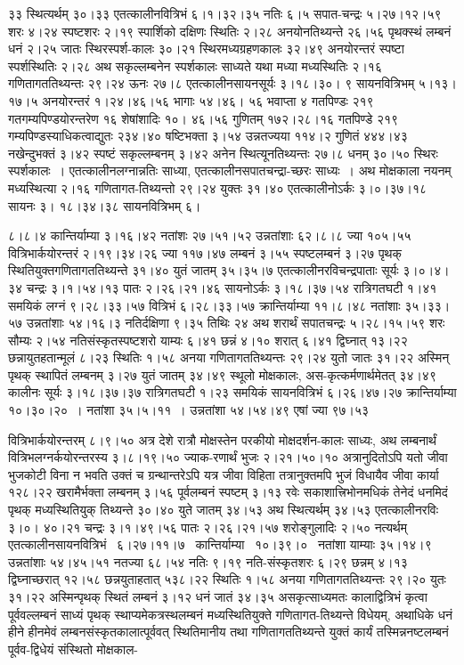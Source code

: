 \documentclass[11pt, openany]{book}
\begin{document}
\newpage

\noindent ३३ स्थित्यर्थम् ३०।३३ एतत्कालीनवित्रिभं ६।१।३२।३५ नतिः ६।५ सपात-चन्द्रः ५।२७।१२।५९ शरः ४।२४ स्पष्टशरः २।१९ स्पार्शिको दक्षिणः स्थितिः २।२८ अनयोनतिथ्यन्ते २६।५६ पृथक्स्थं लम्बनं धनं २।२५ जातः स्थिरस्पर्श-कालः ३०।२१ स्थिरमध्यग्रहणकालः ३२।४९ अनयोरन्तरं स्पष्टा स्पर्शस्थितिः २।२८ अथ सकृल्लम्बनेन स्पर्शकालः साध्यते यथा मध्या मध्यस्थितिः २।१६ गणितागततिथ्यन्तः २९।२४ ऊनः २७।८ एतत्कालीनसायनसूर्यः ३।१८।३०। ९ सायनवित्रिभम् ५।१३।१७।५ अनयोरन्तरं १।२४।४६।५६ भागाः ५४।४६। ५६ भवाप्ता ४ गतपिण्डः २१९ गतगम्यपिण्डयोरन्तरेण १६ शेषांशादिः १०। ४६।५६ \;गुणितम् \;१७२।२८।१६ \;गतपिण्डे \;२१९ \;गम्यपिण्डस्याधिकत्वाद्युतः २३४।४० षष्टिभक्ता ३।५४ उन्नतज्यया ११४।२ गुणितं ४४४।४३ नखेन्दुभक्तं ३।४२ स्पष्टं सकृल्लम्बनम् ३।४२ अनेन स्थित्यूनतिथ्यन्तः २७।८ धनम् ३०।५० स्थिरः स्पर्शकालः~। एतत्कालीनलग्नान्नतिः साध्या, एतत्कालीनसपातचन्द्रा-च्छरः \;साध्यः~। अथ \;मोक्षकाला \;नयनम्\textendash \,मध्यस्थित्या \;२।१६ \;गणितागत-तिथ्यन्तो २९।२४ युक्तः ३१।४० एतत्कालीनोऽर्कः ३।०।३७।१८ सायनः ३। १८।३४।३८ सायनवित्रिभम् ६।

\newpage

\noindent ८।८।४ कान्तिर्याम्या ३।१६।४२ नतांशः २७।५१।५२ उन्नतांशाः ६२।८।८ ज्या १०५।५५ \;वित्रिभार्कयोरन्तरं \;२।१९।३४।२६ \;ज्या \;११७।४७ \;लम्बनं \;३।५५ स्पष्टलम्बनं ३।२७ पृथक् स्थितियुक्तगणितागततिथ्यन्ते ३१।४० युतं जातम् ३५।३५।७ एतत्कालीनरविचन्द्रपाताः सूर्यः ३।०।४।३४ चन्द्रः ३।१।५४।१३ पातः २।२६।२१।४६ सायनोऽर्कः ३।१८।३७।५४ रात्रिगतघटी १।४१ समयिकं लग्नं ९।२८।३३।५७ वित्रिभं ६।२८।३३।५७ क्रान्तिर्याम्या ११।८।४८ नतांशाः ३५।३३।५७ उन्नतांशाः ५४।१६।३ नतिर्दक्षिणा ९।३५ तिथिः २४ अथ शरार्थं सपातचन्द्रः ५।२८।१५।५९ शरः सौम्यः २।५४ नतिसंस्कृतस्पष्टशरो याम्यः ६।४१ \;छन्नं \;४।१० \;शरात् \;६।४१ \;द्विघ्नात् \;१३।२२ \;छन्नायुतहतान्मूलं \;८।२३ स्थितिः १।५८ अनया गणितागततिथ्यन्तः २९।२४ युतो जातः ३१।२२ अस्मिन् पृथक् स्थापितं लम्बनम् ३।२७ युतं जातम् ३४।४९ स्थूलो मोक्षकालः, अस-कृत्कर्मणार्थमेतत् ३४।४९ कालीनः सूर्यः ३।१८।३७।३७ रात्रिगतघटी १।२३ समयिकं सायनवित्रिभं ६।२६।४७।२७ क्रान्तिर्याम्या १०।३०।२०~। नतांशा ३५।५।११~। उन्नतांशा ५४।५४।४९ एषां ज्या ९७।५३

\newpage

\noindent वित्रिभार्कयोरन्तरम् ८।९।५० अत्र देशे रात्रौ मोक्षस्तेन परकीयो मोक्षदर्शन-कालः साध्यः, अथ लम्बनार्थं वित्रिभलग्नर्कयोरन्तरस्य ३।८।१९।५० ज्याक-रणार्थं भुजः २।२१।५०।१० अत्रानुदितोऽपि यतो जीवा भुजकोटी विना न भवति उक्तं च ग्रन्थान्तरेऽपि यत्र जीवा विहिता तत्रानुक्तमपि भुजं विधायैव जीवा कार्या १२८।२२ खरामैर्भक्ता लम्बनम् ३।५६ पूर्वलम्बनं स्पष्टम् ३।१३ रवेः सकाशात्त्रिभोनमधिकं तेनेदं धनमिदं पृथक् मध्यस्थितियुक् तिथ्यन्ते ३०।४० युते जातम् ३४।५३ अथ स्थित्यर्थम् ३४।५३ एतत्कालीनरविः ३।०। ४०।२१ चन्द्रः ३।१।४९।५६ पातः २।२६।२१।५७ शरोङ्गुलादिः २।५० नत्यर्थम् एतत्कालीनसायनवित्रिभं ~६।२७।११।७ ~कान्तिर्याम्या ~१०।३९।० ~नतांशा याम्याः ३५।१४।९ उन्नतांशाः ५४।४५।५१ नतज्या ६८।५४ नतिः ९।१९ नति-संस्कृतशरः ६।२९ छन्नम् ४।१३ द्विघ्नाच्छरात् १२।५८ छन्नयुताहतात् ५३८।२२ स्थितिः १।५८ अनया गणितागततिथ्यन्तः २९।२० युतः ३१।२२ अस्मिन्पृथक् स्थितं लम्बनं ३।१२ धनं जातं ३४।३५ असकृत्साध्यमतः कालाद्वित्रिभं कृत्वा पूर्ववल्लम्बनं साध्यं पृथक् स्थाप्यमेकत्रस्थलम्बनं मध्यस्थितियुक्ते गणितागत-तिथ्यन्ते विधेयम्, अथाधिके धनं हीने हीनमेवं लम्बनसंस्कृतकालात्पूर्ववत् स्थितिमानीय तथा गणितागततिथ्यन्ते युक्तं कार्यं तस्मिन्ननष्टलम्बनं पूर्वव-द्विधेयं संस्थितो मोक्षकाल-
\end{document}
